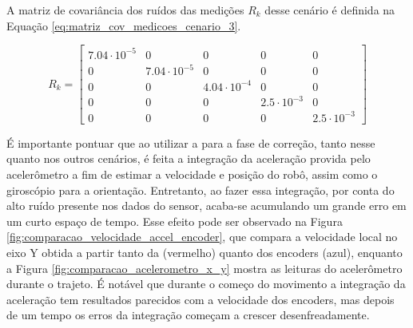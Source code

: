 \documentclass[acronym, symbols, table, deposito]{fei}
\begin{document}
			A matriz de covariância dos ruídos das medições $R_{k}$ desse cenário é definida na Equação \eqref{eq:matriz_cov_medicoes_cenario_3}.
			
			\begin{equation}\label{eq:matriz_cov_medicoes_cenario_3}
				R_{k} = \begin{bmatrix}
					7.04\cdot10^{-5} & 0 & 0 & 0 & 0 \\
					0 & 7.04\cdot10^{-5} & 0 & 0 & 0 \\
					0 & 0 & 4.04\cdot10^{-4} & 0 & 0 \\
					0 & 0 & 0 & 2.5\cdot10^{-3} & 0 \\
					0 & 0 & 0 & 0 & 2.5\cdot10^{-3}
				\end{bmatrix}
			\end{equation}
		
			É importante pontuar que ao utilizar a  para a fase de correção, tanto nesse quanto nos outros cenários, é feita a integração da aceleração provida pelo acelerômetro a fim de estimar a velocidade e posição do robô, assim como o giroscópio para a orientação. Entretanto, ao fazer essa integração, por conta do alto ruído presente nos dados do sensor, acaba-se acumulando um grande erro em um curto espaço de tempo. Esse efeito pode ser observado na Figura \ref{fig:comparacao_velocidade_accel_encoder}, que compara a velocidade local no eixo Y obtida a partir tanto da  (vermelho) quanto dos encoders (azul), enquanto a Figura \ref{fig:comparacao_acelerometro_x_y} mostra as leituras do acelerômetro durante o trajeto. É notável que durante o começo do movimento a integração da aceleração tem resultados parecidos com a velocidade dos encoders, mas depois de um tempo os erros da integração começam a crescer desenfreadamente.
			
\end{document}
